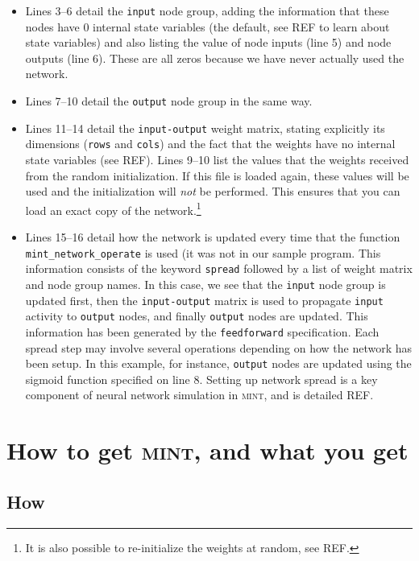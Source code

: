 \documentclass[12pt,letterpaper]{memoir}
\newcommand{\mint}{{\scshape\sffamily mint}\xspace}
\begin{document}
\begin{itemize}
\item Lines 3--6 detail the \lstinline{input} node group, adding the
  information that these nodes have 0 internal state variables (the
  default, see REF to learn about state variables) and also listing
  the value of node inputs (line 5) and node outputs (line 6). These
  are all zeros because we have never actually used the network.
\item Lines 7--10 detail the \lstinline{output} node group in the same
  way.
\item Lines 11--14 detail the \lstinline{input-output} weight matrix,
  stating explicitly its dimensions (\lstinline{rows} and
  \lstinline{cols}) and the fact that the weights have no internal
  state variables (see REF). Lines 9--10 list the values that the
  weights received from the random initialization. If this file is
  loaded again, these values will be used and the initialization will
  \textit{not} be performed. This ensures that you can load an exact
  copy of the network.\footnote{It is also possible to re-initialize
    the weights at random, see REF.}
\item Lines 15--16 detail how the network is updated every time that
  the function \lstinline{mint_network_operate} is used (it was not in
  our sample program. This information consists of the keyword
  \lstinline{spread} followed by a list of weight matrix and node
  group names. In this case, we see that the \lstinline{input} node
  group is updated first, then the \lstinline{input-output} matrix is
  used to propagate \lstinline{input} activity to \lstinline{output}
  nodes, and finally \lstinline{output} nodes are updated. This
  information has been generated by the \lstinline{feedforward}
  specification. Each spread step may involve several operations
  depending on how the network has been setup. In this example, for
  instance, \lstinline{output} nodes are updated using the sigmoid
  function specified on line 8. Setting up network spread is a key
  component of neural network simulation in \mint, and is detailed
  REF.
\end{itemize}


\chapter{How to get \mint, and what you get}
\label{sec:install}

\section{How}
\end{document}
